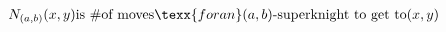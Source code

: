 \documentclass[preview]{standalone}
\begin{document}
\begin{align*}
{N_{(a,b)}(x,y)} \text{is } \# \text{of moves} &\texx{ for an }(a,b)\text{-superknight to get to} (x,y)
\end{align*}
\end{document}
